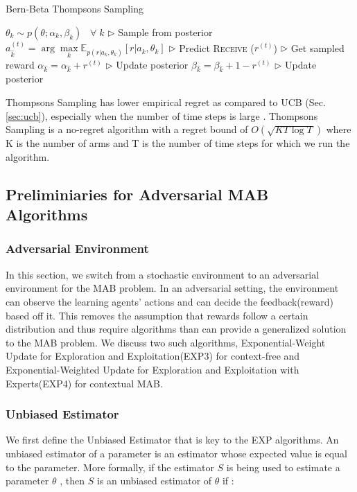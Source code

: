\documentclass[11pt]{article}
\begin{document}
\begin{algorithm}[H]
\caption{Bern-Beta Thompsons Sampling}
\label{algo:thompeff}
\begin{algorithmic}[1]
\STATE $\theta_{k} \sim p(\theta; \alpha_k, \beta_k) \;\;\; \forall \; k$ \hfill $\triangleright$ Sample from posterior
\STATE $a_{\hat{k}}^{(t)} = \arg\max\limits_k \mathbb{E}_{p(r|a_k, \theta_k)}[r|a_k, \theta_k] $ \hfill $\triangleright$ Predict
\STATE \textsc{Receive} ($r^{(t)}$) \hfill $\triangleright$ Get sampled reward
\STATE $\alpha_{\hat{k}} = \alpha_{\hat{k}} + r^{(t)}$ \hfill $\triangleright$ Update posterior
\STATE $\beta_{\hat{k}} = \beta_{\hat{k}} + 1 - r^{(t)}$ \hfill $\triangleright$ Update posterior

\ENDFOR
\end{algorithmic}
\end{algorithm}

Thompsons Sampling has lower empirical regret as compared to UCB (Sec. \ref{sec:ucb}), especially when the number of time steps is large \cite{NIPS2011_e53a0a29}. Thompsons Sampling is a no-regret algorithm with a regret bound of $O(\sqrt{KT\log T})$ where K is the number of arms and T is the number of time steps for which we run the algorithm.

\subsection{Preliminiaries for Adversarial MAB Algorithms}
\label{sec:prelim}

\subsubsection{Adversarial Environment}
In this section, we switch from a stochastic environment to an adversarial environment for the MAB problem. In an adversarial setting, the environment can observe the learning agents' actions and can decide the feedback(reward) based off it. This removes the assumption that rewards follow a certain distribution and thus require algorithms than can provide a generalized solution to the MAB problem. We discuss two such algorithms, Exponential-Weight Update for Exploration and Exploitation(EXP3) for context-free and Exponential-Weighted Update for Exploration and Exploitation with Experts(EXP4) for contextual MAB. 

\subsubsection{Unbiased Estimator}
We first define the Unbiased Estimator that is key to the EXP algorithms. An unbiased estimator of a parameter is an estimator whose expected value is equal to the parameter\cite{unb_est}. More formally, if the estimator $S$  is being used to estimate a parameter  $\theta$ , then  $S$ is an unbiased estimator of $\theta$ if :
\end{document}

